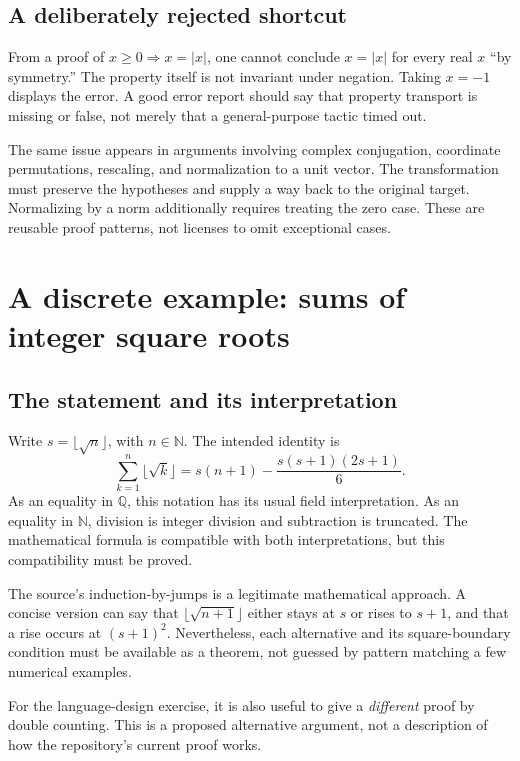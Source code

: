 \documentclass[11pt,a4paper]{article}
\newcommand{\Q}{\mathbb Q}
\newcommand{\N}{\mathbb N}
\theoremstyle{definition}
\theoremstyle{remark}
\begin{document}
\subsection{A deliberately rejected shortcut}
From a proof of $x\ge0\Rightarrow x=|x|$, one cannot conclude $x=|x|$ for every real $x$ ``by symmetry.'' The property itself is not invariant under negation. Taking $x=-1$ displays the error. A good error report should say that property transport is missing or false, not merely that a general-purpose tactic timed out.

The same issue appears in arguments involving complex conjugation, coordinate permutations, rescaling, and normalization to a unit vector. The transformation must preserve the hypotheses and supply a way back to the original target. Normalizing by a norm additionally requires treating the zero case. These are reusable proof patterns, not licenses to omit exceptional cases.

\section{A discrete example: sums of integer square roots}
\label{sec:sum}
\subsection{The statement and its interpretation}
Write $s=\lfloor\sqrt n\rfloor$, with $n\in\N$. The intended identity is
\begin{equation}
 \sum_{k=1}^{n}\lfloor\sqrt k\rfloor
 =s(n+1)-\frac{s(s+1)(2s+1)}6.
 \label{eq:sum}
\end{equation}
As an equality in $\Q$, this notation has its usual field interpretation. As an equality in $\N$, division is integer division and subtraction is truncated. The mathematical formula is compatible with both interpretations, but this compatibility must be proved.

The source's induction-by-jumps is a legitimate mathematical approach. A concise version can say that $\lfloor\sqrt{n+1}\rfloor$ either stays at $s$ or rises to $s+1$, and that a rise occurs at $(s+1)^2$. Nevertheless, each alternative and its square-boundary condition must be available as a theorem, not guessed by pattern matching a few numerical examples.

For the language-design exercise, it is also useful to give a \emph{different} proof by double counting. This is a proposed alternative argument, not a description of how the repository's current proof works.
\end{document}

